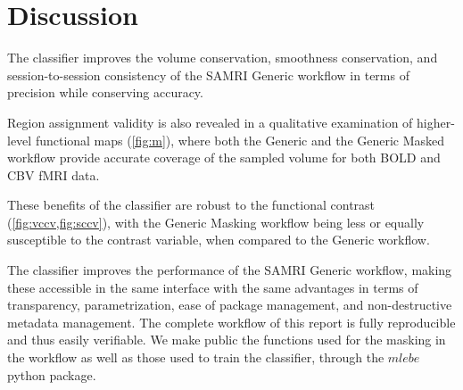\section{Discussion}

The classifier improves the volume conservation, smoothness conservation, and session-to-session consistency of the SAMRI Generic workflow in terms of precision while conserving accuracy.

Region assignment validity is also revealed in a qualitative examination of higher-level functional maps (\cref{fig:m}), where both the Generic and the Generic Masked workflow provide accurate coverage of the sampled volume for both BOLD and CBV fMRI data.

These benefits of the classifier are robust to the functional contrast (\cref{fig:vccv,fig:sccv}), with the Generic Masking workflow being less or equally susceptible to the contrast variable, when compared to the Generic workflow.

The classifier improves the performance of the SAMRI Generic workflow, making these accessible in the same interface with the same advantages in terms of transparency, parametrization, ease of package management, and non-destructive metadata management.
The complete workflow of this report is fully reproducible and thus easily verifiable.
We make public the functions used for the masking in the workflow as well as those used to train the classifier, through the \textcolor{mg}{\texttt{$mlebe$}} \cite{mlebe} python package.

